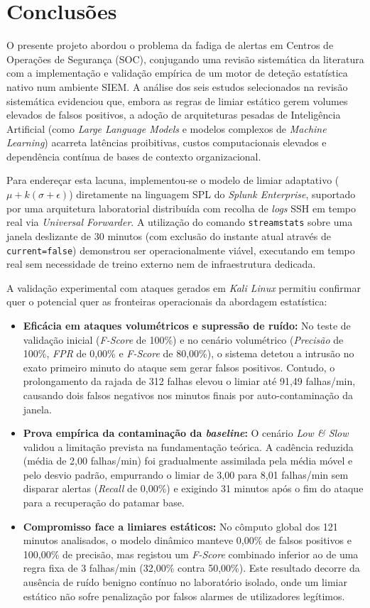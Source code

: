 \documentclass[12pt,a4paper]{article}
\begin{document}
\section{Conclusões}
O presente projeto abordou o problema da fadiga de alertas em Centros de Operações de Segurança (SOC), conjugando uma revisão sistemática da literatura com a implementação e validação empírica de um motor de deteção estatística nativo num ambiente SIEM. A análise dos seis estudos selecionados na revisão sistemática evidenciou que, embora as regras de limiar estático gerem volumes elevados de falsos positivos, a adoção de arquiteturas pesadas de Inteligência Artificial (como \textit{Large Language Models} e modelos complexos de \textit{Machine Learning}) acarreta latências proibitivas, custos computacionais elevados e dependência contínua de bases de contexto organizacional.

Para endereçar esta lacuna, implementou-se o modelo de limiar adaptativo ($\mu + k(\sigma + \epsilon)$) diretamente na linguagem SPL do \textit{Splunk Enterprise}, suportado por uma arquitetura laboratorial distribuída com recolha de \textit{logs} SSH em tempo real via \textit{Universal Forwarder}. A utilização do comando \texttt{streamstats} sobre uma janela deslizante de 30 minutos (com exclusão do instante atual através de \texttt{current=false}) demonstrou ser operacionalmente viável, executando em tempo real sem necessidade de treino externo nem de infraestrutura dedicada.

A validação experimental com ataques gerados em \textit{Kali Linux} permitiu confirmar quer o potencial quer as fronteiras operacionais da abordagem estatística:
\begin{itemize}
    \item \textbf{Eficácia em ataques volumétricos e supressão de ruído:} No teste de validação inicial (\textit{F-Score} de 100\%) e no cenário volumétrico (\textit{Precisão} de 100\%, \textit{FPR} de 0,00\% e \textit{F-Score} de 80,00\%), o sistema detetou a intrusão no exato primeiro minuto do ataque sem gerar falsos positivos. Contudo, o prolongamento da rajada de 312 falhas elevou o limiar até 91,49 falhas/min, causando dois falsos negativos nos minutos finais por auto-contaminação da janela.
    \item \textbf{Prova empírica da contaminação da \textit{baseline}:} O cenário \textit{Low \& Slow} validou a limitação prevista na fundamentação teórica. A cadência reduzida (média de 2,00 falhas/min) foi gradualmente assimilada pela média móvel e pelo desvio padrão, empurrando o limiar de 3,00 para 8,01 falhas/min sem disparar alertas (\textit{Recall} de 0,00\%) e exigindo 31 minutos após o fim do ataque para a recuperação do patamar base.
    \item \textbf{Compromisso face a limiares estáticos:} No cômputo global dos 121 minutos analisados, o modelo dinâmico manteve 0,00\% de falsos positivos e 100,00\% de precisão, mas registou um \textit{F-Score} combinado inferior ao de uma regra fixa de 3 falhas/min (32,00\% contra 50,00\%). Este resultado decorre da ausência de ruído benigno contínuo no laboratório isolado, onde um limiar estático não sofre penalização por falsos alarmes de utilizadores legítimos.
\end{itemize}
\end{document}
